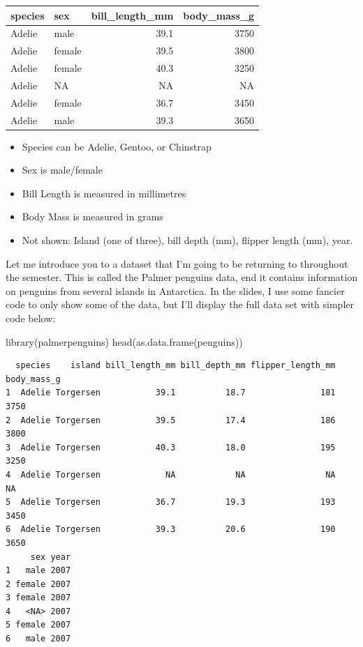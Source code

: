 \documentclass[
  letterpaper,
  DIV=11,
  numbers=noendperiod]{scrreprt}
\newenvironment{Shaded}{\begin{snugshade}}{\end{snugshade}}
\newcommand{\FunctionTok}[1]{\textcolor[rgb]{0.28,0.35,0.67}{#1}}
\newcommand{\NormalTok}[1]{\textcolor[rgb]{0.00,0.23,0.31}{#1}}
\providecommand{\tightlist}{%
  \setlength{\itemsep}{0pt}\setlength{\parskip}{0pt}}\usepackage{longtable,booktabs,array}
\begin{document}
\begin{longtable}[]{@{}llrr@{}}
\toprule\noalign{}
species & sex & bill\_length\_mm & body\_mass\_g \\
\midrule\noalign{}
\endhead
\bottomrule\noalign{}
\endlastfoot
Adelie & male & 39.1 & 3750 \\
Adelie & female & 39.5 & 3800 \\
Adelie & female & 40.3 & 3250 \\
Adelie & NA & NA & NA \\
Adelie & female & 36.7 & 3450 \\
Adelie & male & 39.3 & 3650 \\
\end{longtable}

\begin{itemize}
\tightlist
\item
  Species can be Adelie, Gentoo, or Chinstrap
\item
  Sex is male/female
\item
  Bill Length is measured in millimetres
\item
  Body Mass is measured in grams
\item
  Not shown: Island (one of three), bill depth (mm), flipper length
  (mm), year.
\end{itemize}

Let me introduce you to a dataset that I'm going to be returning to
throughout the semester. This is called the Palmer penguins data, end it
contains information on penguins from several islands in Antarctica. In
the slides, I use some fancier code to only show some of the data, but
I'll display the full data set with simpler code below:

\begin{Shaded}
\begin{Highlighting}[]
\FunctionTok{library}\NormalTok{(palmerpenguins)}
\FunctionTok{head}\NormalTok{(}\FunctionTok{as.data.frame}\NormalTok{(penguins))}
\end{Highlighting}
\end{Shaded}

\begin{verbatim}
  species    island bill_length_mm bill_depth_mm flipper_length_mm body_mass_g
1  Adelie Torgersen           39.1          18.7               181        3750
2  Adelie Torgersen           39.5          17.4               186        3800
3  Adelie Torgersen           40.3          18.0               195        3250
4  Adelie Torgersen             NA            NA                NA          NA
5  Adelie Torgersen           36.7          19.3               193        3450
6  Adelie Torgersen           39.3          20.6               190        3650
     sex year
1   male 2007
2 female 2007
3 female 2007
4   <NA> 2007
5 female 2007
6   male 2007
\end{verbatim}
\end{document}

